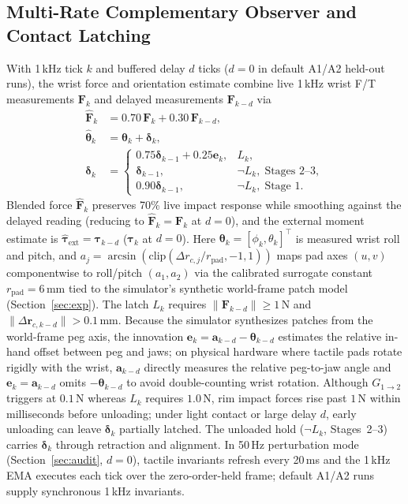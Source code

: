 \documentclass[letterpaper,10pt,conference]{IEEEtran}
\begin{document}
\subsection{Multi-Rate Complementary Observer and Contact Latching}
With 1\,kHz tick $k$ and buffered delay $d$ ticks ($d=0$ in default A1/A2 held-out runs), the wrist force and orientation estimate combine live 1\,kHz wrist F/T measurements $\mathbf{F}_k$ and delayed measurements $\mathbf{F}_{k-d}$ via
\begin{equation}
\begin{aligned}
\hat{\mathbf F}_{k}&=0.70\,\mathbf F_k+0.30\,\mathbf F_{k-d},\\
\hat{\boldsymbol\theta}_{k}&=\boldsymbol\theta_k+\boldsymbol\delta_k,\\
\boldsymbol\delta_k&=
\begin{cases}
0.75\boldsymbol\delta_{k-1}+0.25\mathbf e_k, & L_k,\\
\boldsymbol\delta_{k-1}, & \neg L_k,\;\text{Stages 2--3},\\
0.90\boldsymbol\delta_{k-1}, & \neg L_k,\;\text{Stage 1}.
\end{cases}
\end{aligned}
\label{eq:observer}
\end{equation}
Blended force $\hat{\mathbf F}_k$ preserves 70\% live impact response while smoothing against the delayed reading (reducing to $\hat{\mathbf F}_k=\mathbf F_k$ at $d=0$), and the external moment estimate is $\hat{\boldsymbol\tau}_{\mathrm{ext}}=\boldsymbol\tau_{k-d}$ ($\boldsymbol\tau_k$ at $d=0$). Here $\boldsymbol\theta_k=[\phi_k,\theta_k]^\top$ is measured wrist roll and pitch, and $a_j=\arcsin(\mathrm{clip}(\Delta r_{c,j}/r_{\mathrm{pad}},-1,1))$ maps pad axes $(u,v)$ componentwise to roll/pitch $(a_1,a_2)$ via the calibrated surrogate constant $r_{\mathrm{pad}}=6$\,mm tied to the simulator's synthetic world-frame patch model (Section~\ref{sec:exp}). The latch $L_k$ requires $\|\mathbf F_{k-d}\|\ge1$\,N and $\|\Delta\mathbf r_{c,k-d}\|>0.1$\,mm. Because the simulator synthesizes patches from the world-frame peg axis, the innovation $\mathbf e_k=\mathbf a_{k-d}-\boldsymbol\theta_{k-d}$ estimates the relative in-hand offset between peg and jaws; on physical hardware where tactile pads rotate rigidly with the wrist, $\mathbf a_{k-d}$ directly measures the relative peg-to-jaw angle and $\mathbf e_k=\mathbf a_{k-d}$ omits $-\boldsymbol\theta_{k-d}$ to avoid double-counting wrist rotation. Although $G_{1\to 2}$ triggers at $0.1$\,N whereas $L_k$ requires $1.0$\,N, rim impact forces rise past $1$\,N within milliseconds before unloading; under light contact or large delay $d$, early unloading can leave $\boldsymbol\delta_k$ partially latched. The unloaded hold ($\neg L_k$, Stages~2--3) carries $\boldsymbol\delta_k$ through retraction and alignment. In 50\,Hz perturbation mode (Section~\ref{sec:audit}, $d=0$), tactile invariants refresh every 20\,ms and the 1\,kHz EMA executes each tick over the zero-order-held frame; default A1/A2 runs supply synchronous 1\,kHz invariants.
\end{document}
